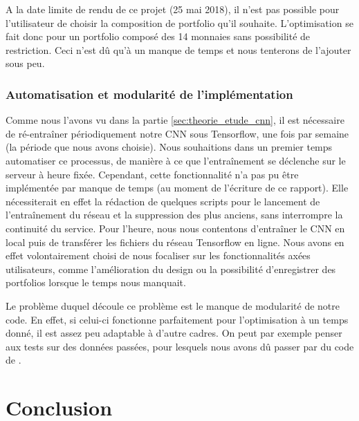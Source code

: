 \documentclass[a4paper, 10pt]{article}
\begin{document}
A la date limite de rendu de ce projet (25 mai 2018), il n'est pas possible pour l'utilisateur de choisir la composition de portfolio qu'il souhaite. L'optimisation se fait donc pour un portfolio composé des 14 monnaies sans possibilité de restriction. Ceci n'est dû qu'à un manque de temps et nous tenterons de l'ajouter sous peu.

\subsubsection{Automatisation et modularité de l'implémentation}
\label{sec:developpement_limites_auto}

Comme nous l'avons vu dans la partie \ref{sec:theorie_etude_cnn}, il est nécessaire de ré-entraîner périodiquement notre CNN sous Tensorflow, une fois par semaine (la période que nous avons choisie). Nous souhaitions dans un premier temps automatiser ce processus, de manière à ce que l'entraînement se déclenche sur le serveur à heure fixée. Cependant, cette fonctionnalité n'a pas pu être implémentée par manque de temps (au moment de l’écriture de ce rapport). Elle nécessiterait en effet la rédaction de quelques scripts pour le lancement de l'entraînement du réseau et la suppression des plus anciens, sans interrompre la continuité du service. Pour l'heure, nous nous contentons d'entraîner le CNN en local puis de transférer les fichiers du réseau Tensorflow en ligne. Nous avons en effet volontairement choisi de nous focaliser sur les fonctionnalités axées utilisateurs, comme l'amélioration du design ou la possibilité d'enregistrer des portfolios lorsque le temps nous manquait.

Le problème duquel découle ce problème est le manque de modularité de notre code. En effet, si celui-ci fonctionne parfaitement pour l'optimisation à un temps donné, il est assez peu adaptable à d'autre cadres. On peut par exemple penser aux tests sur des données passées, pour lesquels nous avons dû passer par du code de \citet{Jiang2017}.

\newpage
\section*{Conclusion}
\label{sec:conclu}
\end{document}
